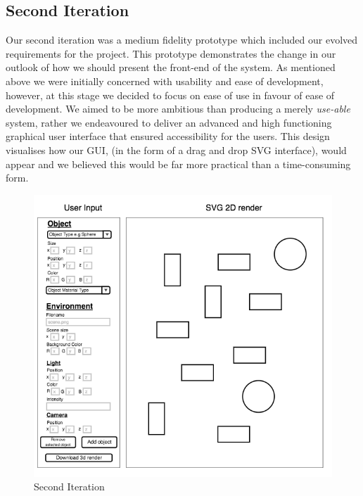 \documentclass[a4paper]{report}
\begin{document}
	\subsection{Second Iteration}
	
	Our second iteration was a medium fidelity prototype which included our evolved requirements for the project. This prototype demonstrates the change in our outlook of how we should present the front-end of the system. As mentioned above we were initially concerned with usability and ease of development, however, at this stage we decided to focus on ease of use in favour of ease of development. We aimed to be more ambitious than producing a merely \textit{use-able} system, rather we endeavoured to deliver an advanced and high functioning graphical user interface that ensured accessibility for the users. This design visualises how our GUI, (in the form of a drag and drop SVG interface), would appear and we believed this would be far more practical than a time-consuming form.
	
	
	
	
	\begin{figure}[ht!]
		\centering
		\includegraphics[scale=0.85]{second_prototype.png}
		\caption{Second Iteration}
		\label{fig:secondIt}
	\end{figure}
	
\end{document}
